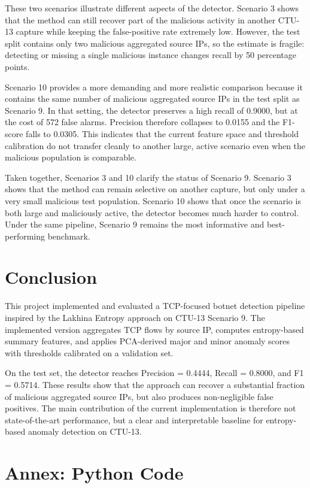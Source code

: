 \documentclass{article}
\begin{document}
These two scenarios illustrate different aspects of the detector. Scenario 3 shows that the method can still recover part of the malicious activity in another CTU-13 capture while keeping the false-positive rate extremely low. However, the test split contains only two malicious aggregated source IPs, so the estimate is fragile: detecting or missing a single malicious instance changes recall by 50 percentage points.

Scenario 10 provides a more demanding and more realistic comparison because it contains the same number of malicious aggregated source IPs in the test split as Scenario 9. In that setting, the detector preserves a high recall of 0.9000, but at the cost of 572 false alarms. Precision therefore collapses to 0.0155 and the F1-score falls to 0.0305. This indicates that the current feature space and threshold calibration do not transfer cleanly to another large, active scenario even when the malicious population is comparable.

Taken together, Scenarios 3 and 10 clarify the status of Scenario 9. Scenario 3 shows that the method can remain selective on another capture, but only under a very small malicious test population. Scenario 10 shows that once the scenario is both large and maliciously active, the detector becomes much harder to control. Under the same pipeline, Scenario 9 remains the most informative and best-performing benchmark.

\section{Conclusion}

This project implemented and evaluated a TCP-focused botnet detection pipeline inspired by the Lakhina Entropy approach on CTU-13 Scenario 9. The implemented version aggregates TCP flows by source IP, computes entropy-based summary features, and applies PCA-derived major and minor anomaly scores with thresholds calibrated on a validation set.

On the test set, the detector reaches Precision = 0.4444, Recall = 0.8000, and F1 = 0.5714. These results show that the approach can recover a substantial fraction of malicious aggregated source IPs, but also produces non-negligible false positives. The main contribution of the current implementation is therefore not state-of-the-art performance, but a clear and interpretable baseline for entropy-based anomaly detection on CTU-13.

\appendix
\section{Annex: Python Code}
\end{document}
